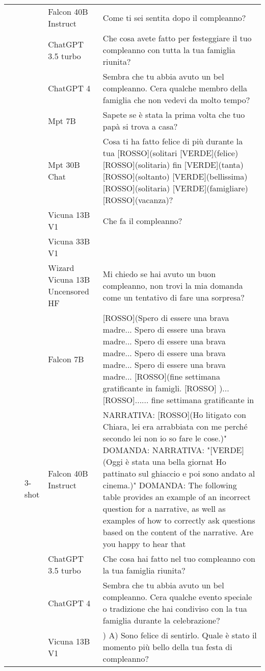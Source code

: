 \begin{center}
\begin{longtable}{l|l|l|p{3cm}|p{8cm}}
 &  &  & Falcon 40B Instruct & Come ti sei sentita dopo il compleanno? \\
 &  &  & ChatGPT 3.5 turbo & Che cosa avete fatto per festeggiare il tuo compleanno con tutta la tua famiglia riunita? \\
 &  &  & ChatGPT 4 & Sembra che tu abbia avuto un bel compleanno. Cera qualche membro della famiglia che non vedevi da molto tempo? \\
 &  &  & Mpt 7B &  Sapete se è stata la prima volta che tuo papà si trova a casa? \\
 &  &  & Mpt 30B Chat &  Cosa ti ha fatto felice di più durante la tua [ROSSO](solitari [VERDE](felice) [ROSSO](solitaria) fin [VERDE](tanta) [ROSSO](soltanto) [VERDE](bellissima) [ROSSO](solitaria) [VERDE](famigliare) [ROSSO](vacanza)? \\
 &  &  & Vicuna 13B V1 &  Che fa il compleanno? \\
 &  &  & Vicuna 33B V1 &  \\
 &  &  & Wizard Vicuna 13B Uncensored HF & Mi chiedo se hai avuto un buon compleanno, non trovi la mia domanda come un tentativo di fare una sorpresa? \\
\cline{3-5}
 &  & \multirow[c]{7}{*}{3-shot} & Falcon 7B &  [ROSSO](Spero di essere una brava madre... Spero di essere una brava madre... Spero di essere una brava madre... Spero di essere una brava madre... Spero di essere una brava madre... [ROSSO](fine settimana gratificante in famigli. [ROSSO] )... [ROSSO]...... fine settimana gratificante in \\
 &  &  & Falcon 40B Instruct & NARRATIVA: [ROSSO](Ho litigato con Chiara, lei era arrabbiata con me perché secondo lei non io so fare le cose.)" DOMANDA: NARRATIVA: "[VERDE](Oggi è stata una bella giornat Ho pattinato sul ghiaccio e poi sono andato al cinema.)" DOMANDA: The following table provides an example of an incorrect question for a narrative, as well as examples of how to correctly ask questions based on the content of the narrative.  Are you happy to hear that \\
 &  &  & ChatGPT 3.5 turbo & Che cosa hai fatto nel tuo compleanno con la tua famiglia riunita? \\
 &  &  & ChatGPT 4 & Sembra che tu abbia avuto un bel compleanno. Cera qualche evento speciale o tradizione che hai condiviso con la tua famiglia durante la celebrazione? \\
 &  &  & Vicuna 13B V1 & ) A) Sono felice di sentirlo. Quale è stato il momento più bello della tua festa di compleanno? \\

\end{longtable}
\end{center}
